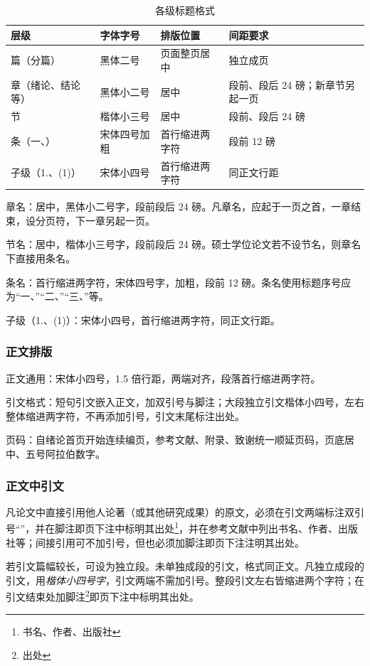 \begin{table}[H]
	\centering
	\caption{各级标题格式}
	\begin{tabular}{llll}
		\toprule
		层级 & 字体字号 & 排版位置 & 间距要求 \\
		\midrule
		篇（分篇） & 黑体二号 & 页面整页居中 & 独立成页 \\
		章（绪论、结论等） & 黑体小二号 & 居中 & 段前、段后 24 磅；新章节另起一页 \\
		节 & 楷体小三号 & 居中 & 段前、段后 24 磅 \\
		条（一、） & 宋体四号加粗 & 首行缩进两字符 & 段前 12 磅 \\
		子级（1.、(1)） & 宋体小四号 & 首行缩进两字符 & 同正文行距 \\
		\bottomrule
	\end{tabular}
	\label{tab:heading}
\end{table}

章名：居中，黑体小二号字，段前段后 24 磅。凡章名，应起于一页之首，一章结束，设分页符，下一章另起一页。

节名：居中，楷体小三号字，段前段后 24 磅。硕士学位论文若不设节名，则章名下直接用条名。

条名：首行缩进两字符，宋体四号字，加粗，段前 12 磅。条名使用标题序号应为“一、”“二、”“三、”等。

子级（1.、(1)）：宋体小四号，首行缩进两字符，同正文行距。

\subsubsection{正文排版}

正文通用：宋体小四号，1.5 倍行距，两端对齐，段落首行缩进两字符。

引文格式：短句引文嵌入正文，加双引号与脚注；大段独立引文楷体小四号，左右整体缩进两字符，不再添加引号，引文末尾标注出处。

页码：自绪论首页开始连续编页，参考文献、附录、致谢统一顺延页码，页底居中、五号阿拉伯数字。

\subsubsection{正文中引文}

凡论文中直接引用他人论著（或其他研究成果）的原文，必须在引文两端标注双引号“”，并在脚注即页下注中标明其出处\footnote{书名、作者、出版社}，并在参考文献中列出书名、作者、出版社等；间接引用可不加引号，但也必须加脚注即页下注注明其出处。

若引文篇幅较长，可设为独立段。未单独成段的引文，格式同正文。凡独立成段的引文，用\textit{楷体小四号字}，引文两端不需加引号。整段引文左右皆缩进两个字符；在引文结束处加脚注\footnote{出处}即页下注中标明其出处。

